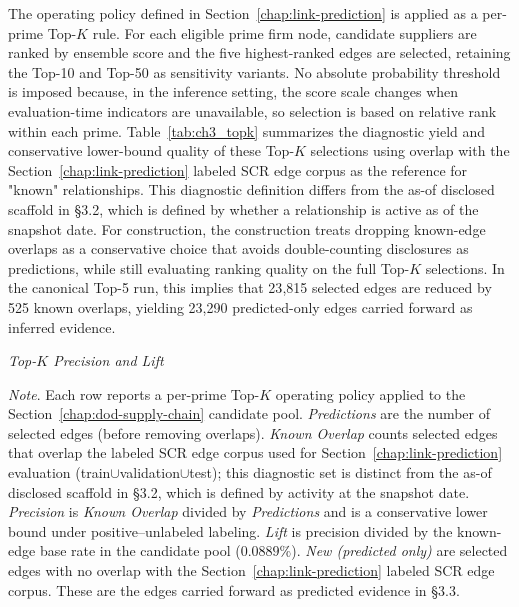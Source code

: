 The operating policy defined in Section~\ref{chap:link-prediction} is applied as a per-prime Top-$K$ rule. For each eligible prime firm node, candidate suppliers are ranked by ensemble score and the five highest-ranked edges are selected, retaining the Top-10 and Top-50 as sensitivity variants. No absolute probability threshold is imposed because, in the inference setting, the score scale changes when evaluation-time indicators are unavailable, so selection is based on relative rank within each prime. Table~\ref{tab:ch3_topk} summarizes the diagnostic yield and conservative lower-bound quality of these Top-$K$ selections using overlap with the Section~\ref{chap:link-prediction} labeled SCR edge corpus as the reference for "known" relationships. This diagnostic definition differs from the as-of disclosed scaffold in \S3.2, which is defined by whether a relationship is active as of the snapshot date. For construction, the construction treats dropping known-edge overlaps as a conservative choice that avoids double-counting disclosures as predictions, while still evaluating ranking quality on the full Top-$K$ selections. In the canonical Top-5 run, this implies that 23{,}815 selected edges are reduced by 525 known overlaps, yielding 23{,}290 predicted-only edges carried forward as inferred evidence.

\begin{table}[tbp]
  \centering
  \caption[\textit{Top-$K$ Precision and Lift}]{\textit{Top-$K$ Precision and Lift}}
  \label{tab:ch3_topk}

  \begin{adjustbox}{max width=\linewidth}
    
  \end{adjustbox}

  \captionsetup{justification=raggedright,singlelinecheck=false}
  \caption*{\footnotesize \textit{Note}. Each row reports a per-prime Top-$K$ operating policy applied to the Section~\ref{chap:dod-supply-chain} candidate pool. \emph{Predictions} are the number of selected edges (before removing overlaps). \emph{Known Overlap} counts selected edges that overlap the labeled SCR edge corpus used for Section~\ref{chap:link-prediction} evaluation (train$\cup$validation$\cup$test); this diagnostic set is distinct from the as-of disclosed scaffold in \S3.2, which is defined by activity at the snapshot date. \emph{Precision} is \emph{Known Overlap} divided by \emph{Predictions} and is a conservative lower bound under positive--unlabeled labeling. \emph{Lift} is precision divided by the known-edge base rate in the candidate pool ($0.0889\%$). \emph{New (predicted only)} are selected edges with no overlap with the Section~\ref{chap:link-prediction} labeled SCR edge corpus. These are the edges carried forward as predicted evidence in \S3.3.}
\end{table}

